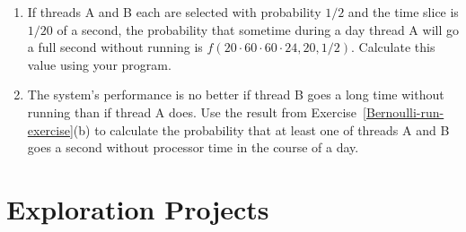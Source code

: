\begin{chapterEnumerate}
\begin{enumerate}
\item
If threads A and B each are selected with probability $1/2$ and the
time slice is $1/20$ of a second, the probability that sometime during a day thread A will go a
full second without running is $f(20 \cdot 60
\cdot 60 \cdot 24, 20, 1/2)$.  Calculate this value using your
program.
\item
The system's performance is no better if thread B goes a long time
without running than if thread A does.
Use the result from Exercise~\ref{Bernoulli-run-exercise}(b)
to calculate the probability that at least one of threads
A and B goes a second without processor time in the course of a day.
\end{enumerate}
\end{chapterEnumerate}

\section*{Exploration Projects}
